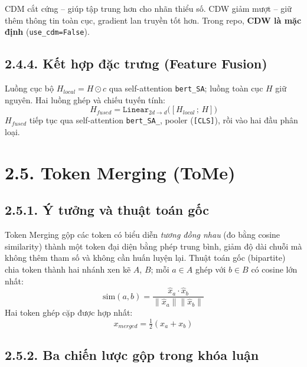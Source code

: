 CDM cắt cứng -- giúp tập trung hơn cho nhãn thiểu số.
CDW giảm mượt -- giữ thêm thông tin toàn cục, gradient lan truyền tốt hơn.
Trong repo, \textbf{CDW là mặc định} (\texttt{use\_cdm=False}).

\subsection{2.4.4.\; Kết hợp đặc trưng (Feature Fusion)}
\label{subsec:fusion}

Luồng cục bộ $H_{local} = H \odot c$ qua self-attention \texttt{bert\_SA};
luồng toàn cục $H$ giữ nguyên. Hai luồng ghép và chiếu tuyến tính:
\begin{equation}
H_{fused} = \texttt{Linear}_{2d\to d}\big([H_{local}\,;\,H]\big)
\label{eq:fusion}
\end{equation}
$H_{fused}$ tiếp tục qua self-attention \texttt{bert\_SA\_}, pooler
(\texttt{[CLS]}), rồi vào hai đầu phân loại.

\section{2.5.\; Token Merging (ToMe)}
\label{sec:tome}

\subsection{2.5.1.\; Ý tưởng và thuật toán gốc}

Token Merging \cite{bolya2023tome} gộp các token có biểu diễn \emph{tương
đồng nhau} (đo bằng cosine similarity) thành một token đại diện bằng
phép trung bình, giảm độ dài chuỗi mà không thêm tham số và không cần
huấn luyện lại. Thuật toán gốc (bipartite) chia token thành hai nhánh
xen kẽ $A$, $B$; mỗi $a \in A$ ghép với $b \in B$ có cosine lớn nhất:
\begin{equation}
\text{sim}(a,b)=\frac{\hat{x}_a\cdot\hat{x}_b}{\|\hat{x}_a\|\|\hat{x}_b\|}
\label{eq:cosine}
\end{equation}
Hai token ghép cặp được hợp nhất:
\begin{equation}
x_{merged} = \tfrac{1}{2}(x_a+x_b)
\label{eq:merge_avg}
\end{equation}

\subsection{2.5.2.\; Ba chiến lược gộp trong khóa luận}
\label{subsec:tome_strategies}

